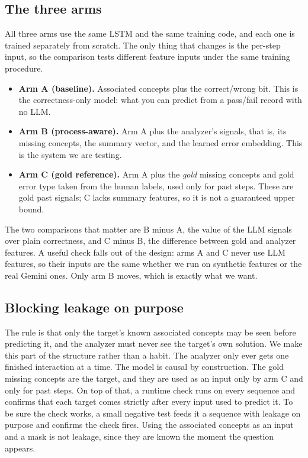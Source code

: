 \documentclass[11pt]{article}
\begin{document}
\subsection{The three arms}
All three arms use the same LSTM and the same training code, and each one is trained
separately from scratch. The only thing that changes is the per-step input, so the comparison tests different feature inputs under the same training procedure.
\begin{itemize}[leftmargin=1.4em,itemsep=2pt,topsep=2pt]
\item \textbf{Arm A (baseline).} Associated concepts plus the correct/wrong bit. This is
the correctness-only model: what you can predict from a pass/fail record with no LLM.
\item \textbf{Arm B (process-aware).} Arm A plus the analyzer's signals, that is, its
missing concepts, the summary vector, and the learned error embedding. This is the
system we are testing.
\item \textbf{Arm C (gold reference).} Arm A plus the \emph{gold} missing concepts and
gold error type taken from the human labels, used only for past steps. These are gold past signals; C lacks summary features, so it is not a guaranteed upper bound.
\end{itemize}
The two comparisons that matter are B minus A, the value of the LLM signals over plain
correctness, and C minus B, the difference between gold and analyzer features. A useful check
falls out of the design: arms A and C never use LLM features, so their inputs are the same
whether we run on synthetic features or the real Gemini ones. Only arm B moves, which is
exactly what we want.

\subsection{Blocking leakage on purpose}
\label{sec:leakage}
The rule is that only the target's known associated concepts may be seen before predicting it, and the
analyzer must never see the target's own solution. We make this part of the structure
rather than a habit. The analyzer only ever gets one finished interaction at a time. The
model is causal by construction. The gold missing concepts are the target, and they
are used as an input only by arm C and only for past steps. On top of that, a runtime
check runs on every sequence and confirms that each target comes strictly after every
input used to predict it. To be sure the check works, a small negative test feeds it a
sequence with leakage on purpose and confirms the check fires. Using the associated
concepts as an input and a mask is not leakage, since they are known the moment the
question appears.
\end{document}

